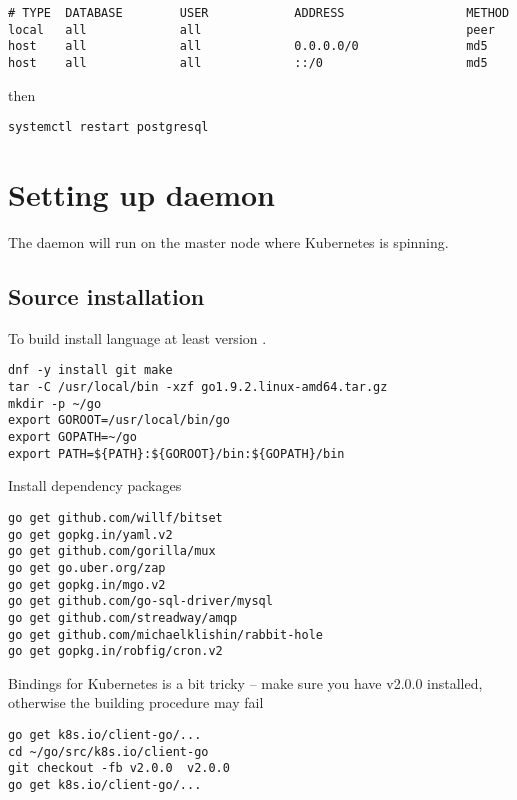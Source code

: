 \begin{lstlisting}
# TYPE  DATABASE        USER            ADDRESS                 METHOD
local   all             all                                     peer
host    all             all             0.0.0.0/0               md5
host    all             all             ::/0                    md5
\end{lstlisting}

then

\begin{lstlisting}
systemctl restart postgresql
\end{lstlisting}

\section{Setting up  daemon}
\label{sec:setup-swifty}

The  daemon will run on the master node
where Kubernetes is spinning.

\subsection{Source installation}
\label{subsec:setup-swifty-src}

To build  install 
language at least version
.

\begin{lstlisting}
dnf -y install git make
tar -C /usr/local/bin -xzf go1.9.2.linux-amd64.tar.gz
mkdir -p ~/go
export GOROOT=/usr/local/bin/go
export GOPATH=~/go
export PATH=${PATH}:${GOROOT}/bin:${GOPATH}/bin
\end{lstlisting}

Install dependency packages

\begin{lstlisting}
go get github.com/willf/bitset
go get gopkg.in/yaml.v2
go get github.com/gorilla/mux
go get go.uber.org/zap
go get gopkg.in/mgo.v2
go get github.com/go-sql-driver/mysql
go get github.com/streadway/amqp
go get github.com/michaelklishin/rabbit-hole
go get gopkg.in/robfig/cron.v2
\end{lstlisting}

Bindings for Kubernetes is a bit tricky -- make sure you have v2.0.0 installed,
otherwise the building procedure may fail

\begin{lstlisting}
go get k8s.io/client-go/...
cd ~/go/src/k8s.io/client-go
git checkout -fb v2.0.0  v2.0.0
go get k8s.io/client-go/...
\end{lstlisting}

